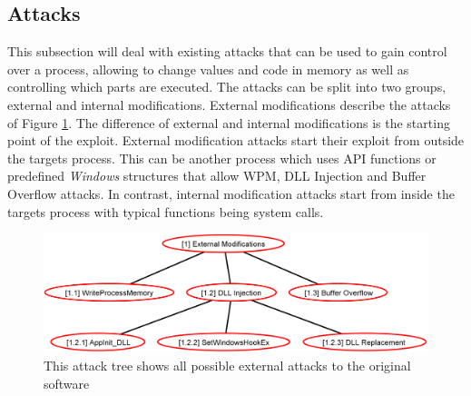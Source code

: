 \subsection{Attacks}
\label{sec:attacks}
This subsection will deal with existing attacks that can be used to gain control over a process, allowing to change values and code in memory as well as controlling which parts are executed. The attacks can be split into two groups, external and internal modifications. External modifications describe the attacks of Figure \ref{fig:attacks_external}. The difference of external and internal modifications is the starting point of the exploit. External modification attacks start their exploit from outside the targets process. This can be another process which uses \gls{API} functions or predefined \emph{Windows} structures that allow \gls{WPM}, \gls{DLL} Injection and Buffer Overflow attacks. In contrast, internal modification attacks start from inside the targets process with typical functions being system calls.
\begin{figure}[!htbp]
\centering
\includegraphics[width=\textwidth,keepaspectratio]{sections/adtrees/ExternalModificationsWithoutDefenses.png}
\caption{This attack tree shows all possible external attacks to the original software}
\label{fig:attacks_external}
\end{figure}






